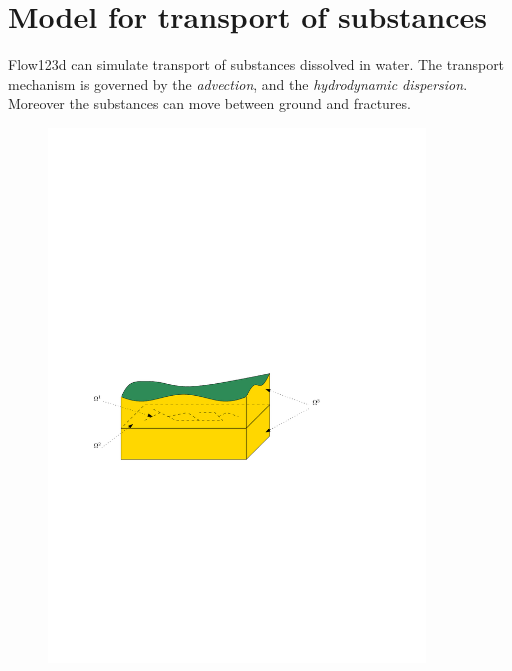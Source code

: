\documentclass[a4paper]{article}
\begin{document}
\section{Model for transport of substances}

Flow123d can simulate transport of substances dissolved in water.
The transport mechanism is governed by the \emph{advection}, and the \emph{hydrodynamic dispersion}.
Moreover the substances can move between ground and fractures.
\begin{figure}[h]
\centering
\includegraphics[width=10cm]{ground_fractures}
\end{figure}
\end{document}
